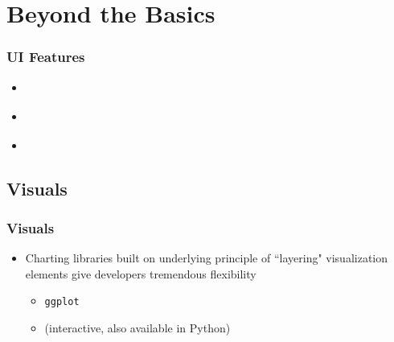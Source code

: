 \documentclass[
	11pt, %
]{beamer}
\begin{document}


\section{Beyond the Basics}

%	
%	


\begin{frame}
	\frametitle{UI Features}
	
	\begin{itemize}
		\item\href{https://shiny.rstudio.com/gallery/widget-gallery.html}{\color{blue}{Widgets}}
		\item \href{http://shinyapps.dreamrs.fr/shinyWidgets/}{\color{blue}{Even more widgets}}
		\item \href{https://shiny.rstudio.com/articles/progress.html}{\color{blue}{Progress bars}}
		\end{itemize}
\end{frame}




\subsection{Visuals}

\begin{frame}
	\frametitle{Visuals}
	
	\begin{itemize}
		\item Charting libraries built on underlying principle of ``layering" visualization elements give developers tremendous flexibility
		\begin{itemize}
			\item \texttt{ggplot} 
			\item \href{https://plotly.com/r/}{} (interactive, also available in Python) 
		\end{itemize}
	\end{itemize}
\end{frame}
\end{document}
